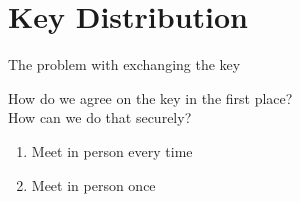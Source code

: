 \documentclass{beamer}
\begin{document}
	\section{Key Distribution}
	\begin{frame}{The problem with exchanging the key} %

		How do we agree on the key in the first place? \\
		How can we do that securely?\linebreak


		\begin{enumerate}
			\item<2-> Meet in person every time %


 			\item<3-> Meet in person once %
		\end{enumerate}


	\end{frame}

\end{document}

